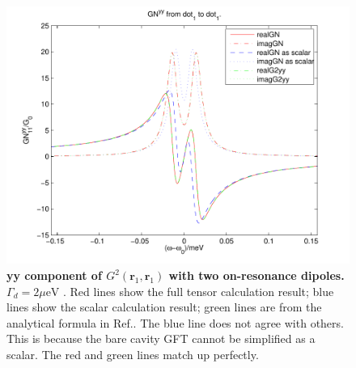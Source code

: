 \begin{figure}[H]
\centering
\begin{center}
\includegraphics[width=14cm]{./Figs/G84_2yy11_2}
\end{center}
\caption[yy component of $G^2(\mathbf{r}_1,\mathbf{r}_1)$  with two on-resonance dipoles.]{\textbf{  yy component of $G^2(\mathbf{r}_1,\mathbf{r}_1)$  with two on-resonance dipoles. $\Gamma_d = 2 \mu{\text {eV}}$ }. Red lines show the full tensor calculation result; blue lines show the scalar calculation result; green lines are from the analytical formula in Ref.\cite{Yao2009c}. The blue line does not agree with others. This is because the bare cavity GFT cannot be simplified as a scalar. The red and green lines match up perfectly.}
\label{G84_2yy11_2}
\end{figure}


